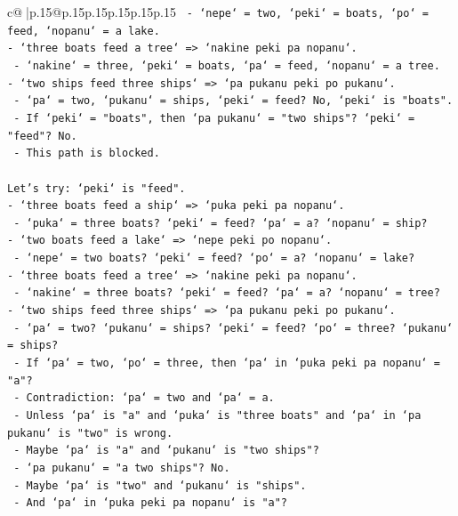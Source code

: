 \documentclass{article}
\begin{document}
{\begin{supertabular}{c@{$\;$}|p{.15\linewidth}@{}p{.15\linewidth}p{.15\linewidth}p{.15\linewidth}p{.15\linewidth}p{.15\linewidth}}
{{{\texttt{  {-} `nepe` = two, `peki` = boats, `po` = feed, `nopanu` = a lake.} \\
\texttt{{-} `three boats feed a tree` => `nakine peki pa nopanu`.} \\
\texttt{  {-} `nakine` = three, `peki` = boats, `pa` = feed, `nopanu` = a tree.} \\
\texttt{{-} `two ships feed three ships` => `pa pukanu peki po pukanu`.} \\
\texttt{  {-} `pa` = two, `pukanu` = ships, `peki` = feed? No, `peki` is "boats".} \\
\texttt{  {-} If `peki` = "boats", then `pa pukanu` = "two ships"? `peki` = "feed"? No.} \\
\texttt{  {-} This path is blocked.} \\
\\ 
\texttt{Let's try: `peki` is "feed".} \\
\texttt{{-} `three boats feed a ship` => `puka peki pa nopanu`.} \\
\texttt{  {-} `puka` = three boats? `peki` = feed? `pa` = a? `nopanu` = ship?} \\
\texttt{{-} `two boats feed a lake` => `nepe peki po nopanu`.} \\
\texttt{  {-} `nepe` = two boats? `peki` = feed? `po` = a? `nopanu` = lake?} \\
\texttt{{-} `three boats feed a tree` => `nakine peki pa nopanu`.} \\
\texttt{  {-} `nakine` = three boats? `peki` = feed? `pa` = a? `nopanu` = tree?} \\
\texttt{{-} `two ships feed three ships` => `pa pukanu peki po pukanu`.} \\
\texttt{  {-} `pa` = two? `pukanu` = ships? `peki` = feed? `po` = three? `pukanu` = ships?} \\
\texttt{  {-} If `pa` = two, `po` = three, then `pa` in `puka peki pa nopanu` = "a"?} \\
\texttt{  {-} Contradiction: `pa` = two and `pa` = a.} \\
\texttt{  {-} Unless `pa` is "a" and `puka` is "three boats" and `pa` in `pa pukanu` is "two" is wrong.} \\
\texttt{  {-} Maybe `pa` is "a" and `pukanu` is "two ships"?} \\
\texttt{  {-} `pa pukanu` = "a two ships"? No.} \\
\texttt{  {-} Maybe `pa` is "two" and `pukanu` is "ships".} \\
\texttt{  {-} And `pa` in `puka peki pa nopanu` is "a"?} \\
}}}
\end{supertabular}}
\end{document}
